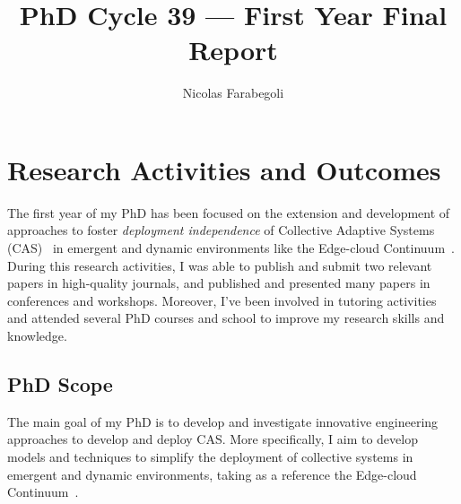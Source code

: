 \documentclass[runningheads]{llncs}
\begin{document}
%
\title{PhD Cycle 39 --- First Year Final Report
}
%
%
\author{Nicolas Farabegoli}
%
%
%
\maketitle              %
%

%
%
%
\section{Research Activities and Outcomes}

The first year of my PhD has been focused on the extension and development of approaches to foster \emph{deployment independence} of Collective Adaptive Systems (CAS)~\cite{DBLP:conf/birthday/BucchiaroneM19} in emergent and dynamic environments like the Edge-cloud Continuum~\cite{DBLP:journals/access/MoreschiniPLNHT22}.
%
During this research activities,
I was able to publish and submit two relevant papers in high-quality journals,
and published and presented many papers in conferences and workshops.
%
Moreover,
I've been involved in tutoring activities and attended several PhD courses and school to improve my research skills and knowledge.

\subsection{PhD Scope}

The main goal of my PhD is to develop and investigate innovative engineering approaches to develop and deploy CAS.
%
More specifically,
I aim to develop models and techniques to simplify the deployment of collective systems in emergent and dynamic environments,
taking as a reference the Edge-cloud Continuum~\cite{DBLP:journals/access/MoreschiniPLNHT22}.
\end{document}
